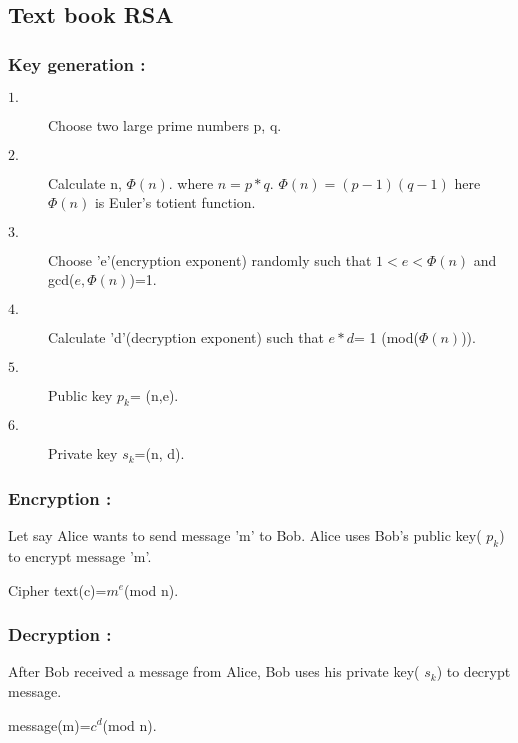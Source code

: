 \documentclass{article}
\begin{document}
	
	\subsection{Text book RSA}

	\subsubsection{Key generation :}
	 
	\begin{description}
		\item[$1.$] Choose two large prime numbers p, q.
		\item[$2.$] Calculate n, $\Phi(n)$.
		where $n=p*q$.
		$\Phi(n)=(p-1)(q-1)$ here $\Phi(n)$ is Euler's totient function.
		\item[$3.$] Choose 'e'(encryption exponent) randomly such that $1< e < \Phi(n)$ and gcd($e, \Phi(n)$)=1.
		\item[$4.$] Calculate 'd'(decryption exponent) such that $e*d $= 1 (mod($\Phi(n)$)).
		\item[$5.$] Public key $p_{k}$= (n,e).
		\item[$6.$] Private key $s_{k}$=(n, d).
		
	\end{description}

\subsubsection{Encryption :}
Let say Alice wants to send message 'm' to Bob. Alice uses Bob's public key( $p_{k}$) to encrypt message 'm'.

Cipher text(c)=$m^{e}$(mod n).
\subsubsection{Decryption :}
After Bob received a message from Alice, Bob uses his private key( $s_{k}$) to decrypt message.

message(m)=$c^{d}$(mod n).
\end{document}
